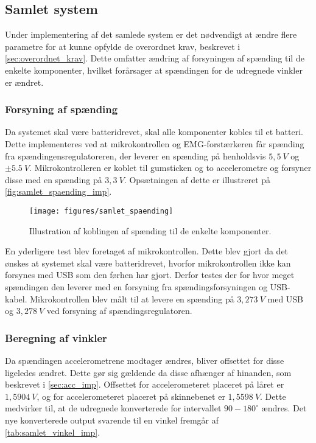 \subsection{Samlet system}
Under implementering af det samlede system er det nødvendigt at ændre flere parametre for at kunne opfylde de overordnet krav, beskrevet i  \autoref{sec:overordnet_krav}. Dette omfatter ændring af forsyningen af spænding til de enkelte komponenter, hvilket forårsager at spændingen for de udregnede vinkler er ændret.

\subsubsection{Forsyning af spænding}
Da systemet skal være batteridrevet, skal alle komponenter kobles til et batteri. Dette implementeres ved at mikrokontrollen og EMG-forstærkeren får spænding fra spændingensregulatoreren, der leverer en spænding på henholdsvis $5,5~V$ og $\pm 5.5~V$. Mikrokontrolleren er koblet til gumsticken og to accelerometre og forsyner disse med en spænding på $3,3~V$. Opsætningen af dette er illustreret på \autoref{fig:samlet_spaending_imp}. 

\begin{figure}[H]
\centering
\texttt{[image: figures/samlet\_spaending]}
\caption{Illustration af koblingen af spænding til de enkelte komponenter.}
\label{fig:samlet_spaending_imp}
\end{figure}

En yderligere test blev foretaget af mikrokontrollen. Dette blev gjort da det ønskes at systemet skal være batteridrevet, hvorfor mikrokontrollen ikke kan forsynes med USB som den førhen har gjort. Derfor testes der for hvor meget spændingen den leverer med en forsyning fra spændingsforsyningen og USB-kabel. Mikrokontrollen blev målt til at levere en spænding på $3,273~V$ med USB og $3,278~V$ ved forsyning af spændingsregulatoren.

\subsubsection{Beregning af vinkler}
Da spændingen accelerometrene modtager ændres, bliver offsettet for disse ligeledes ændret. Dette gør sig gældende da disse afhænger af hinanden, som  beskrevet i \autoref{sec:acc_imp}. Offsettet for accelerometeret placeret på låret er $1,5904~V$, og for accelerometeret placeret på skinnebenet er $1,5598~V$. Dette medvirker til, at de udregnede konverterede for intervallet $90-180^{\circ}$ ændres. Det nye konverterede output svarende til en vinkel fremgår af \autoref{tab:samlet_vinkel_imp}. 

